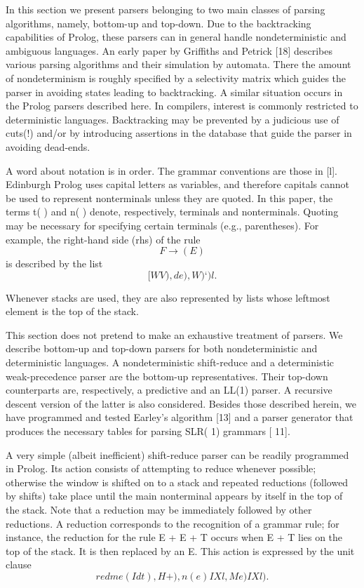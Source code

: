 \label{cohen2}

In this section we present parsers belonging to two main classes of parsing
algorithms, namely, bottom-up and top-down. Due to the backtracking capabilities
of Prolog, these parsers can in general handle nondeterministic and
ambiguous languages. An early paper by Griffiths and Petrick [18] describes
various parsing algorithms and their simulation by automata. There the amount
of nondeterminism is roughly specified by a selectivity matrix which guides the
parser in avoiding states leading to backtracking. A similar situation occurs in
the Prolog parsers described here. In compilers, interest is commonly restricted 
to deterministic languages. Backtracking may be prevented by a judicious use of
cuts(!) and/or by introducing assertions in the database that guide the parser in
avoiding dead-ends. 

A word about notation is in order. The grammar conventions are those in [l].
Edinburgh Prolog uses capital letters as variables, and therefore capitals cannot
be used to represent nonterminals unless they are quoted. In this paper, the
terms t( ) and n( ) denote, respectively, terminals and nonterminals. Quoting
may be necessary for specifying certain terminals (e.g., parentheses). For example,
the right-hand side (rhs) of the rule
\[F \rightarrow (E)\]
is described by the list 
\[[WV), de), W)‘)l. \]

Whenever stacks are used, they are also represented by lists whose leftmost
element is the top of the stack. 

This section does not pretend to make an exhaustive treatment of parsers.
We describe bottom-up and top-down parsers for both nondeterministic and
deterministic languages. A nondeterministic shift-reduce and a deterministic
weak-precedence parser are the bottom-up representatives. Their top-down counterparts
are, respectively, a predictive and an LL(1) parser. A recursive descent
version of the latter is also considered. Besides those described herein, we have
programmed and tested Earley’s algorithm [13] and a parser generator that
produces the necessary tables for parsing SLR( 1) grammars [ 11]. 

\secdown


A very simple (albeit inefficient) shift-reduce parser can be readily programmed
in Prolog. Its action consists of attempting to reduce whenever possible; otherwise
the window is shifted on to a stack and repeated reductions (followed by shifts)
take place until the main nonterminal appears by itself in the top of the stack.
Note that a reduction may be immediately followed by other reductions. A
reduction corresponds to the recognition of a grammar rule; for instance, the
reduction for the rule E + E + T occurs when E + T lies on the top of the stack.
It is then replaced by an E. This action is expressed by the unit clause
\[redme(Idt), H+), n(e) I Xl, Me) I Xl). \]


